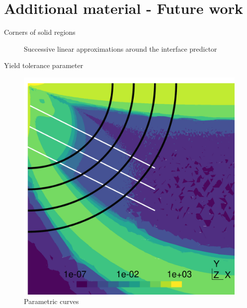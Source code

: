 \documentclass{beamer}  %
\begin{document}
\section*{Additional material - Future work}
\begin{frame}{Corners of solid regions}
    \begin{figure}
        \centering
        \begin{subfigure}[t]{0.26\textwidth}
            
        \end{subfigure}
        \begin{subfigure}[t]{0.26\textwidth}
            
        \end{subfigure}
        \begin{subfigure}[t]{0.26\textwidth}
            
        \end{subfigure}
        \caption*{Successive linear approximations around the interface predictor}
    \end{figure}
\end{frame}


\begin{frame}{Yield tolerance parameter}
    \begin{figure}
        \centering
        \includegraphics[height=0.65\textheight]{../figures/correction_2.pdf}
        \caption*{Parametric curves}
    \end{figure}
\end{frame}
\end{document}
